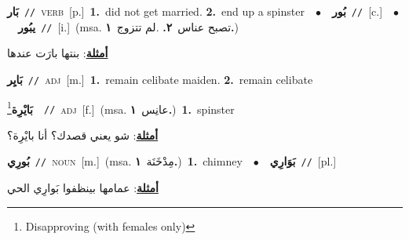 \documentclass[10pt,a4paper,twoside]{article} %
\begin{document}
\begin{multicols}{2}
{\setlength\topsep{0pt}\textbf{\foreignlanguage{arabic}{بَار}}\ {\color{gray}\texttt{//}\color{black}}\ \textsc{verb}\ [p.]\ \textbf{1.}~did not get married.  \textbf{2.}~end up a spinster\ \ $\bullet$\ \ \setlength\topsep{0pt}\textbf{\foreignlanguage{arabic}{بُور}}\ {\color{gray}\texttt{//}\color{black}}\ [c.]\ \ $\bullet$\ \ \setlength\topsep{0pt}\textbf{\foreignlanguage{arabic}{يبُور}}\ {\color{gray}\texttt{//}\color{black}}\ [i.]\ \color{gray}(msa. \foreignlanguage{arabic}{تصبح عناس}~\foreignlanguage{arabic}{\textbf{٢.}}  .\foreignlanguage{arabic}{لم تتزوج}~\foreignlanguage{arabic}{\textbf{١.}})\color{black}\  \begin{flushright}\color{gray}\foreignlanguage{arabic}{\textbf{\underline{\foreignlanguage{arabic}{أمثلة}}}: بنتها بارَت عندها}\end{flushright}\color{black}} \vspace{2mm}

{\setlength\topsep{0pt}\textbf{\foreignlanguage{arabic}{بَايِر}}\ {\color{gray}\texttt{//}\color{black}}\ \textsc{adj}\ [m.]\ \textbf{1.}~remain celibate maiden.  \textbf{2.}~remain celibate\ } \vspace{2mm}

{\setlength\topsep{0pt}\textbf{\foreignlanguage{arabic}{بَايْرِة}}\footnote{Disapproving (with females only)}\ \ {\color{gray}\texttt{//}\color{black}}\ \textsc{adj}\ [f.]\ \color{gray}(msa. \foreignlanguage{arabic}{عانِس}~\foreignlanguage{arabic}{\textbf{١.}})\color{black}\ \textbf{1.}~spinster\  \begin{flushright}\color{gray}\foreignlanguage{arabic}{\textbf{\underline{\foreignlanguage{arabic}{أمثلة}}}: شو يعني قصدك؟ أنا بايْرِة؟}\end{flushright}\color{black}} \vspace{2mm}

{\setlength\topsep{0pt}\textbf{\foreignlanguage{arabic}{بُورِي}}\ {\color{gray}\texttt{//}\color{black}}\ \textsc{noun}\ [m.]\ \color{gray}(msa. \foreignlanguage{arabic}{مِدْخَنَة}~\foreignlanguage{arabic}{\textbf{١.}})\color{black}\ \textbf{1.}~chimney\ \ $\bullet$\ \ \setlength\topsep{0pt}\textbf{\foreignlanguage{arabic}{بَوَارِي}}\ {\color{gray}\texttt{//}\color{black}}\ [pl.]\  \begin{flushright}\color{gray}\foreignlanguage{arabic}{\textbf{\underline{\foreignlanguage{arabic}{أمثلة}}}: عمامها بينظفوا بَوارِي الحي}\end{flushright}\color{black}} \vspace{2mm}


\end{multicols}
\end{document}
